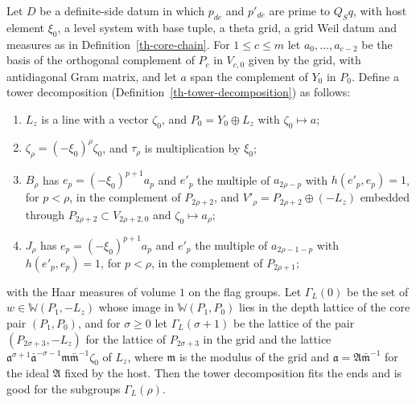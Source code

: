 \begin{lemma}\label{th-standard-tower}
Let $D$ be a definite-side datum in which $p_{de}$ and $p'_{de}$ are prime to
$Q_Sq$, with host element $\xi_0$, a level system with base tuple, a theta
grid, a grid Weil datum and measures as in Definition~\ref{th-core-chain}. For
$1\leq c\leq m$ let $a_0,\ldots,a_{c-2}$ be the basis of the orthogonal
complement of $P_c$ in $V_{c,0}$ given by the grid, with antidiagonal Gram
matrix, and let $a$ span the complement of $Y_0$ in $P_0$. Define a tower
decomposition (Definition~\ref{th-tower-decomposition}) as follows:
\begin{enumerate}
\item $L_z$ is a line with a vector $\zeta_0$, and $P_0=Y_0\oplus L_z$ with
  $\zeta_0\mapsto a$;
\item $\zeta_\rho=(-\xi_0)^\rho\zeta_0$, and $\tau_\rho$ is multiplication by
  $\xi_0$;
\item $B_\rho$ has $e_p=(-\xi_0)^{p+1}a_p$ and $e'_p$ the multiple of
  $a_{2\rho-p}$ with $h(e'_p,e_p)=1$, for $p<\rho$, in the complement of
  $P_{2\rho+2}$, and $V'_\rho=P_{2\rho+2}\oplus(-L_z)$ embedded through
  $P_{2\rho+2}\subset V_{2\rho+2,0}$ and $\zeta_0\mapsto a_\rho$;
\item $J_\rho$ has $e_p=(-\xi_0)^{p+1}a_p$ and $e'_p$ the multiple of
  $a_{2\rho-1-p}$ with $h(e'_p,e_p)=1$, for $p<\rho$, in the complement of
  $P_{2\rho+1}$;
\end{enumerate}
with the Haar measures of volume $1$ on the flag groups. Let
$\Gamma_L(0)$ be the set of $w\in\mathbb W(P_1,-L_z)$ whose image in
$\mathbb W(P_1,P_0)$ lies in the depth lattice of the core pair $(P_1,P_0)$,
and for $\sigma\geq0$ let $\Gamma_L(\sigma+1)$ be the lattice of the pair
$(P_{2\sigma+3},-L_z)$ for the lattice of $P_{2\sigma+3}$ in the grid and the
lattice
$\mathfrak a^{\sigma+1}\bar{\mathfrak a}^{-\sigma-1}\mathfrak m\bar{\mathfrak m}^{-1}\zeta_0$
of $L_z$, where $\mathfrak m$ is the modulus of the grid and
$\mathfrak a=\mathfrak A\bar{\mathfrak m}^{-1}$ for the ideal $\mathfrak A$
fixed by the host. Then the tower decomposition fits the ends and is good for
the subgroups $\Gamma_L(\rho)$.
\end{lemma}
